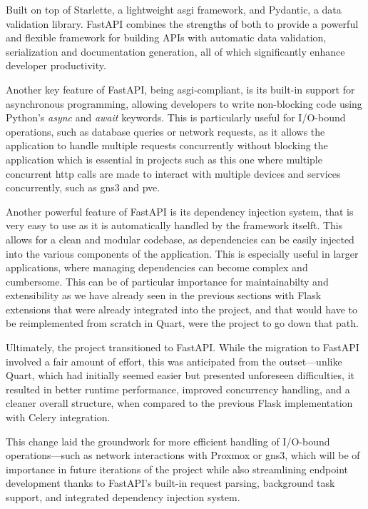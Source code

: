 Built on top of Starlette, a lightweight \ac{asgi} framework, and Pydantic, a data validation library. FastAPI combines the 
strengths of both to provide a powerful and flexible framework for building APIs with automatic data validation, 
serialization and documentation generation, all of which significantly enhance developer productivity.

Another key feature of FastAPI, being \ac{asgi}-compliant, is its built-in support for asynchronous programming, allowing 
developers to write non-blocking code using Python's \textit{async} and \textit{await} keywords. This is particularly useful 
for I/O-bound operations, such as database queries or network requests, as it allows the application to handle multiple 
requests concurrently without blocking the application which is essential in projects such as this one where multiple 
concurrent \ac{http} calls are made to interact with multiple devices and services concurrently, such as \ac{gns3} and 
\ac{pve}.

Another powerful feature of FastAPI is its dependency injection system, that is very easy to use as it is automatically
handled by the framework itselft. This allows for a clean and modular codebase, as dependencies can be easily injected into
the various components of the application. This is especially useful in larger applications, where managing dependencies
can become complex and cumbersome.
This can be of particular importance for maintainabilty and extensibility as we have already seen in the previous sections 
with Flask extensions that were already integrated into the project, and that would have to be reimplemented from scratch 
in Quart, were the project to go down that path. 

Ultimately, the project transitioned to FastAPI. While the migration to FastAPI involved a fair amount of effort, this 
was anticipated from the outset—unlike Quart, which had initially seemed easier but presented unforeseen difficulties, 
it resulted in better runtime performance, improved concurrency handling, and a cleaner overall structure, when compared 
to the previous Flask implementation with Celery integration.

This change laid the groundwork for more efficient handling of I/O-bound operations—such as network interactions with 
Proxmox or \ac{gns3}, which will be of importance in future iterations of the project while also streamlining endpoint 
development thanks to FastAPI's built-in request parsing, background task support, and integrated dependency injection system.

